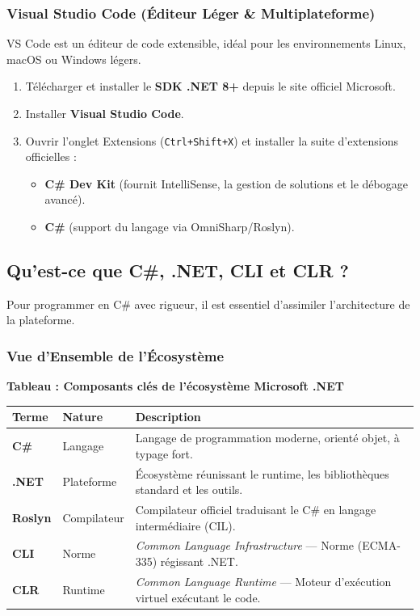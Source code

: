 \subsubsection{Visual Studio Code (Éditeur Léger \& Multiplateforme)}
VS Code est un éditeur de code extensible, idéal pour les environnements Linux, macOS ou Windows légers.
\begin{enumerate}
    \item Télécharger et installer le \textbf{SDK .NET 8+} depuis le site officiel Microsoft.
    \item Installer \textbf{Visual Studio Code}.
    \item Ouvrir l'onglet Extensions (\texttt{Ctrl+Shift+X}) et installer la suite d'extensions officielles :
    \begin{itemize}
        \item \textbf{C\# Dev Kit} (fournit IntelliSense, la gestion de solutions et le débogage avancé).
        \item \textbf{C\#} (support du langage via OmniSharp/Roslyn).
    \end{itemize}
\end{enumerate}

\subsection{Qu'est-ce que C\#, .NET, CLI et CLR ?}

Pour programmer en C\# avec rigueur, il est essentiel d'assimiler l'architecture de la plateforme.

\subsubsection{Vue d'Ensemble de l'Écosystème}

\begin{center}
    \textbf{Tableau : Composants clés de l'écosystème Microsoft .NET} \\[0.3cm]
    \begin{tabular}{@{}llp{8cm}@{}}
        \toprule
        \textbf{Terme} & \textbf{Nature} & \textbf{Description} \\
        \midrule
        \textbf{C\#} & Langage & Langage de programmation moderne, orienté objet, à typage fort. \\
        \textbf{.NET} & Plateforme & Écosystème réunissant le runtime, les bibliothèques standard et les outils. \\
        \textbf{Roslyn} & Compilateur & Compilateur officiel traduisant le C\# en langage intermédiaire (CIL). \\
        \textbf{CLI} & Norme & \emph{Common Language Infrastructure} — Norme (ECMA-335) régissant .NET. \\
        \textbf{CLR} & Runtime & \emph{Common Language Runtime} — Moteur d'exécution virtuel exécutant le code. \\
        \bottomrule
    \end{tabular}
\end{center}

